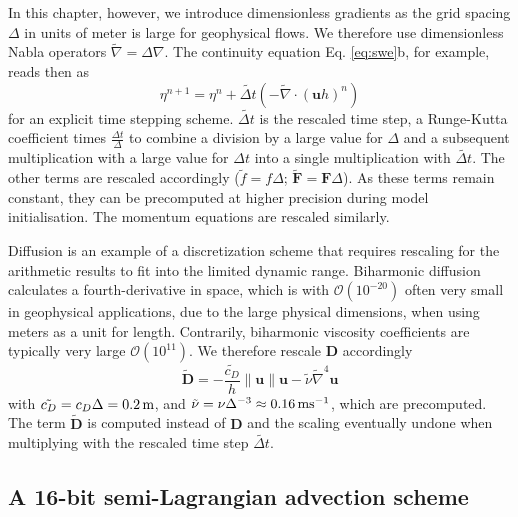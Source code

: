 In this chapter, however, we introduce dimensionless gradients as the grid spacing $\Delta$ in units of meter is large for geophysical flows.
We therefore use dimensionless Nabla operators $\tilde{\nabla} = \Delta\nabla$. The continuity equation Eq. \ref{eq:swe}b, for example,
reads then as
\begin{equation}
\eta^{n+1} = \eta^n + \tilde{\Delta t}\left( - \tilde{\nabla} \cdot (\mathbf{u}h)^n\right)
\label{eq:discr}
\end{equation}
for an explicit time stepping scheme. $\tilde{\Delta t}$ is the rescaled time step, a Runge-Kutta coefficient times $\tfrac{\Delta t}{\Delta}$ to
combine a division by a large value for $\Delta$ and a subsequent multiplication with a large value for $\Delta t$ into a single multiplication
with $\tilde{\Delta t}$. The other terms are rescaled accordingly ($\tilde{f} = f\Delta$; $\tilde{\mathbf{F}} = \mathbf{F}\Delta$). As these terms
remain constant, they can be precomputed at higher precision during model initialisation. The momentum equations are rescaled similarly.

Diffusion is an example of a discretization scheme that requires rescaling for the arithmetic results to fit into the limited dynamic range.
Biharmonic diffusion \citep{Griffies2000} calculates a fourth-derivative in space, which is with $\mathcal{O}(10^{-20})$ often very small in
geophysical applications, due to the large physical dimensions, when using meters as a unit for length. Contrarily, biharmonic viscosity
coefficients are typically very large
$\mathcal{O}(10^{11})$.
We therefore rescale $\mathbf{D}$ accordingly
\begin{equation}
\tilde{\mathbf{D}} =-\frac{\tilde{c_D}}{h}\| \mathbf{u} \| \mathbf{u} -
\tilde{\nu}\tilde{\nabla}^4\mathbf{u}
\end{equation}
with $\tilde{c_D} = c_D\Delta = 0.2\operatorname{m}$,  and $\tilde{\nu} = \nu\Delta^{-3}
\approx 0.16\operatorname{ms}^{-1}$, which are precomputed. The term
$\tilde{\mathbf{D}}$ is computed instead of $\mathbf{D}$ and the scaling eventually
undone when multiplying with the rescaled time step $\tilde{\Delta t}$.


\subsection{A 16-bit semi-Lagrangian advection scheme}
\label{sec:swm_semilagrange}

